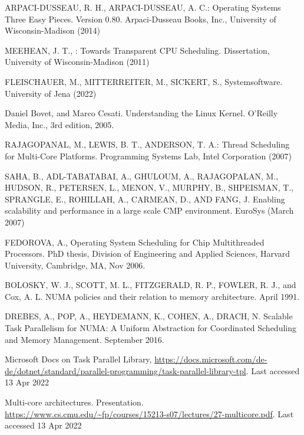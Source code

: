 \documentclass[runningheads]{llncs}
\begin{document}
%
%

 
\newpage

\begin{thebibliography}{8}

ARPACI-DUSSEAU, R. H., ARPACI-DUSSEAU, A. C.: Operating Systems Three Easy Pieces. Version 0.80. Arpaci-Dusseau Books, Inc.,
University of Wisconsin-Madison (2014)

MEEHEAN, J. T., : Towards Transparent CPU Scheduling. Dissertation,
University of Wisconsin-Madison (2011)

FLEISCHAUER, M., MITTERREITER, M., SICKERT, S., Systemsoftware.
University of Jena (2022)

Daniel Bovet, and Marco Cesati. Understanding the Linux Kernel. O’Reilly
Media, Inc., 3rd edition, 2005.

RAJAGOPANAL, M., LEWIS, B. T., ANDERSON, T. A.: Thread Scheduling for Multi-Core Platforms. Programming Systems Lab, Intel Corporation (2007)

SAHA, B., ADL-TABATABAI, A., GHULOUM, A., RAJAGOPALAN,
M., HUDSON, R., PETERSEN, L., MENON, V.,
MURPHY, B., SHPEISMAN, T., SPRANGLE, E., ROHILLAH, A.,
CARMEAN, D., AND FANG, J. Enabling scalability and performance
in a large scale CMP environment. EuroSys (March 2007)

FEDOROVA, A., Operating System Scheduling for Chip Multithreaded
Processors. PhD thesis, Division of Engineering and
Applied Sciences, Harvard University, Cambridge, MA, Nov
2006.

BOLOSKY, W. J., SCOTT, M. L., FITZGERALD, R. P., FOWLER, R. J., and Cox, A. L.
NUMA policies and their relation to memory
architecture. April 1991.

DREBES, A., POP, A., HEYDEMANN, K., COHEN, A., DRACH, N.
Scalable Task Parallelism for NUMA: A Uniform Abstraction
for Coordinated Scheduling and Memory Management. September 2016.

Microsoft Docs on Task Parallel Library, \url{https://docs.microsoft.com/de-de/dotnet/standard/parallel-programming/task-parallel-library-tpl}. 
Last accessed 13 Apr 2022

Multi-core architectures. Presentation. \url{https://www.cs.cmu.edu/~fp/courses/15213-s07/lectures/27-multicore.pdf}. 
Last accessed 13 Apr 2022


\end{thebibliography}
\end{document}
